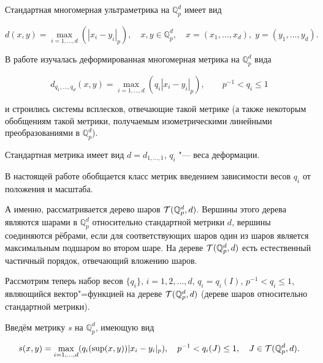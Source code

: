 
Стандартная многомерная ультраметрика на $\mathbb{Q}_p^d$ имеет вид

\begin{equation}\label{metr:metrica_d}

d(x,y)=\max_{i=1,\dots,d}(|x_i-y_i|_p),\quad x, y  \in \mathbb{Q}_p^d, \quad x=(x_1, \dots, x_d), \;  y=(y_1, \dots, y_d).

\end{equation}





В работе \cite{quincunx} изучалась деформированная многомерная метрика на $\mathbb{Q}_p^d$ вида

$$

d_{q_1,\dots,q_d}(x,y)=\max_{i=1,\dots,d}(q_i|x_i-y_i|_p),\qquad p^{-1}<q_i\le 1

$$

и строились системы всплесков, отвечающие такой метрике (а также некоторым обобщениям такой метрики, получаемым изометрическими линейными преобразованиями в $\mathbb{Q}_p^d$).

Стандартная метрика имеет вид $d=d_{1,\dots,1}$, $q_i$ "--- веса деформации.



В настоящей работе обобщается класс метрик введением зависимости весов $q_i$ от положения и масштаба. 

А именно, рассматривается дерево шаров ${\cal T}(\mathbb{Q}_p^d,d)$. Вершины этого дерева являются шарами в $\mathbb{Q}_p^d$ относительно стандартной метрики $d$, вершины соединяются рёбрами, если для соответствующих шаров один из шаров является максимальным подшаром во втором шаре. На дереве ${\cal T}(\mathbb{Q}_p^d,d)$ есть естественный частичный порядок, отвечающий вложению шаров.



Рассмотрим теперь набор весов $\{q_i\}$, $i=1, 2, \dots, d$, $q_i=q_i(I)$, $p^{-1}<q_i\le 1$, являющийся вектор"=функцией на дереве ${\cal T}(\mathbb{Q}_p^d,d)$ (дереве шаров относительно стандартной метрики).





Введём метрику $s$ на $\mathbb{Q}_p^d$, имеющую вид

\begin{equation}\label{metr:metrica_s}

s(x,y)=\max_{i=1,\dots,d}(q_i({\rm sup}(x,y))|x_i-y_i|_p),\quad p^{-1}<q_i(J)\le 1,\quad J\in {\cal T}(\mathbb{Q}_p^d,d).

\end{equation}

